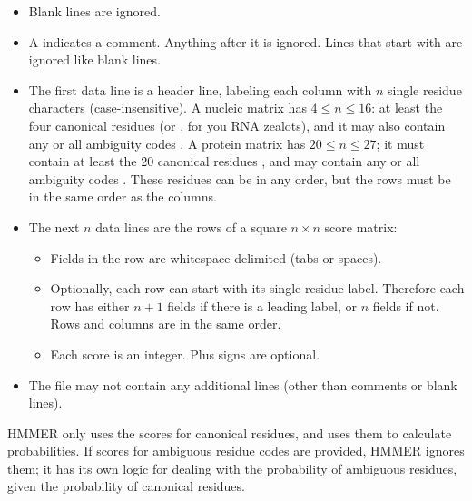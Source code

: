 \begin{itemize}

\item Blank lines are ignored.

\item A \mono{\#} indicates a comment. Anything after it is
  ignored. Lines that start with \mono{\#} are ignored like blank
  lines.

\item The first data line is a header line, labeling each column with
  $n$ single residue characters (case-insensitive). A nucleic matrix
  has $4 \leq n \leq 16$: at least the four canonical residues
   (or , for you RNA zealots), and it may also
  contain any or all ambiguity codes . A protein
  matrix has $20 \leq n \leq 27$; it must contain at least the 20 canonical
  residues , and may contain any or all
  ambiguity codes . These residues can be in any order,
  but the rows must be in the same order as the columns.

\item The next $n$ data lines are the rows of a square $n \times n$
  score matrix:

\begin{itemize}
\item  Fields in the row are whitespace-delimited (tabs or
       spaces).

\item Optionally, each row can start with its single residue label.
  Therefore each row has either $n+1$ fields if there is a leading
  label, or $n$ fields if not. Rows and columns are in the same order.

\item  Each score is an integer. Plus signs are optional. 
\end{itemize}

\item The file may not contain any additional lines (other than
  comments or blank lines).
\end{itemize}

HMMER only uses the scores for canonical residues, and uses them to
calculate probabilities. If scores for ambiguous residue codes are
provided, HMMER ignores them; it has its own logic for dealing with
the probability of ambiguous residues, given the probability of
canonical residues.






  
